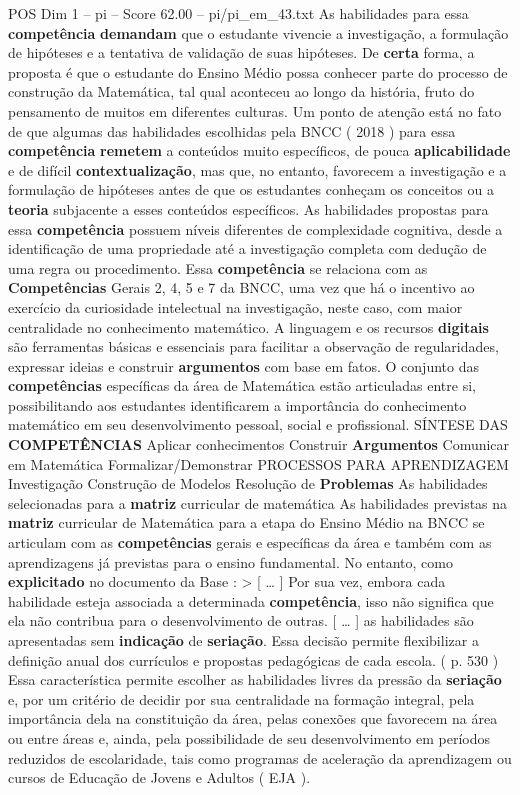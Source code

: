 \begin{textsample}{POS Dim 1 – pi – Score 62.00 – pi/pi\_em\_43.txt}
As habilidades para essa \textbf{competência} \textbf{demandam} que o estudante vivencie a investigação, a formulação de hipóteses e a tentativa de validação de suas hipóteses.
De \textbf{certa} forma, a proposta é que o estudante do Ensino Médio possa conhecer parte do processo de construção da Matemática, tal qual aconteceu ao longo da história, fruto do pensamento de muitos em diferentes culturas.
Um ponto de atenção está no fato de que algumas das habilidades escolhidas pela BNCC ( 2018 ) para essa \textbf{competência} \textbf{remetem} a conteúdos muito específicos, de pouca \textbf{aplicabilidade} e de difícil \textbf{contextualização}, mas que, no entanto, favorecem a investigação e a formulação de hipóteses antes de que os estudantes conheçam os conceitos ou a \textbf{teoria} subjacente a esses conteúdos específicos.
As habilidades propostas para essa \textbf{competência} possuem níveis diferentes de complexidade cognitiva, desde a identificação de uma propriedade até a investigação completa com dedução de uma regra ou procedimento.
Essa \textbf{competência} se relaciona com as \textbf{Competências} Gerais 2, 4, 5 e 7 da BNCC, uma vez que há o incentivo ao exercício da curiosidade intelectual na investigação, neste caso, com maior centralidade no conhecimento matemático.
A linguagem e os recursos \textbf{digitais} são ferramentas básicas e essenciais para facilitar a observação de regularidades, expressar ideias e construir \textbf{argumentos} com base em fatos.
O conjunto das \textbf{competências} específicas da área de Matemática estão articuladas entre si, possibilitando aos estudantes identificarem a importância do conhecimento matemático em seu desenvolvimento pessoal, social e profissional.
SÍNTESE DAS \textbf{COMPETÊNCIAS} Aplicar conhecimentos Construir \textbf{Argumentos} Comunicar em Matemática Formalizar/Demonstrar PROCESSOS PARA APRENDIZAGEM Investigação Construção de Modelos Resolução de \textbf{Problemas} As habilidades selecionadas para a \textbf{matriz} curricular de matemática As habilidades previstas na \textbf{matriz} curricular de Matemática para a etapa do Ensino Médio na BNCC se articulam com as \textbf{competências} gerais e específicas da área e também com as aprendizagens já previstas para o ensino fundamental.
No entanto, como \textbf{explicitado} no documento da Base : > [ … ] Por sua vez, embora cada habilidade esteja associada a determinada \textbf{competência}, isso não significa que ela não contribua para o desenvolvimento de outras. [ … ] as habilidades são apresentadas sem \textbf{indicação} de \textbf{seriação}.
Essa decisão permite flexibilizar a definição anual dos currículos e propostas pedagógicas de cada escola. ( p. 530 ) Essa característica permite escolher as habilidades livres da pressão da \textbf{seriação} e, por um critério de decidir por sua centralidade na formação integral, pela importância dela na constituição da área, pelas conexões que favorecem na área ou entre áreas e, ainda, pela possibilidade de seu desenvolvimento em períodos reduzidos de escolaridade, tais como programas de aceleração da aprendizagem ou cursos de Educação de Jovens e Adultos ( EJA ).

\end{textsample}
